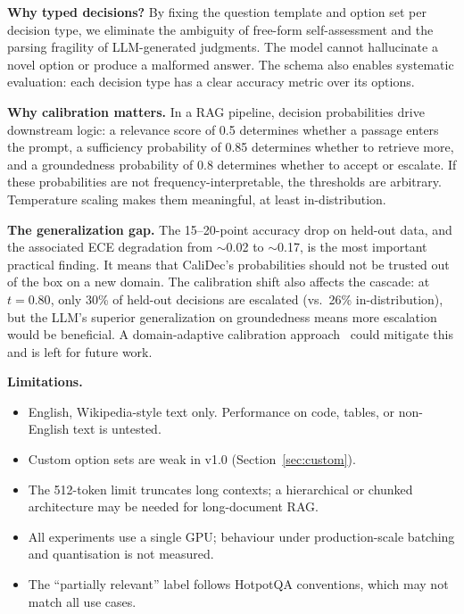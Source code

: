 \documentclass[twocolumn]{ICCKjournal}
\begin{document}
\textbf{Why typed decisions?} By fixing the question template and option set per decision type, we eliminate the ambiguity of free-form self-assessment and the parsing fragility of LLM-generated judgments. The model cannot hallucinate a novel option or produce a malformed answer. The schema also enables systematic evaluation: each decision type has a clear accuracy metric over its options.

\textbf{Why calibration matters.} In a RAG pipeline, decision probabilities drive downstream logic: a relevance score of 0.5 determines whether a passage enters the prompt, a sufficiency probability of 0.85 determines whether to retrieve more, and a groundedness probability of 0.8 determines whether to accept or escalate. If these probabilities are not frequency-interpretable, the thresholds are arbitrary. Temperature scaling makes them meaningful, at least in-distribution.

\textbf{The generalization gap.} The 15--20-point accuracy drop on held-out data, and the associated ECE degradation from $\sim$0.02 to $\sim$0.17, is the most important practical finding. It means that CaliDec's probabilities should not be trusted out of the box on a new domain. The calibration shift also affects the cascade: at $t=0.80$, only 30\% of held-out decisions are escalated (vs.\ 26\% in-distribution), but the LLM's superior generalization on groundedness means more escalation would be beneficial. A domain-adaptive calibration approach~\cite{zhao2021calibrate} could mitigate this and is left for future work.

\textbf{Limitations.}
\begin{itemize}[leftmargin=*]
    \item English, Wikipedia-style text only. Performance on code, tables, or non-English text is untested.
    \item Custom option sets are weak in v1.0 (Section~\ref{sec:custom}).
    \item The 512-token limit truncates long contexts; a hierarchical or chunked architecture may be needed for long-document RAG.
    \item All experiments use a single GPU; behaviour under production-scale batching and quantisation is not measured.
    \item The ``partially relevant'' label follows HotpotQA conventions, which may not match all use cases.
\end{itemize}

\end{document}
